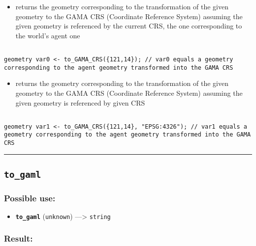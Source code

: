 \documentclass[]{book}
\providecommand{\tightlist}{%
  \setlength{\itemsep}{0pt}\setlength{\parskip}{0pt}}
\theoremstyle{definition}
\theoremstyle{definition}
\theoremstyle{definition}
\theoremstyle{remark}
\begin{document}
\begin{itemize}
\tightlist
\item
  returns the geometry corresponding to the transformation of the given
  geometry to the GAMA CRS (Coordinate Reference System) assuming the
  given geometry is referenced by the current CRS, the one corresponding
  to the world's agent one
\end{itemize}

\begin{verbatim}
 
geometry var0 <- to_GAMA_CRS({121,14}); // var0 equals a geometry corresponding to the agent geometry transformed into the GAMA CRS
\end{verbatim}

\begin{itemize}
\tightlist
\item
  returns the geometry corresponding to the transformation of the given
  geometry to the GAMA CRS (Coordinate Reference System) assuming the
  given geometry is referenced by given CRS
\end{itemize}

\begin{verbatim}
 
geometry var1 <- to_GAMA_CRS({121,14}, "EPSG:4326"); // var1 equals a geometry corresponding to the agent geometry transformed into the GAMA CRS
\end{verbatim}

\begin{center}\rule{0.5\linewidth}{\linethickness}\end{center}

\subsection{\texorpdfstring{\texttt{to\_gaml}}{to\_gaml}}\label{to_gaml}

\subsubsection{Possible use:}\label{possible-use-521}

\begin{itemize}
\tightlist
\item
  \textbf{\texttt{to\_gaml}} (\texttt{unknown}) ---\textgreater{}
  \texttt{string}
\end{itemize}

\subsubsection{Result:}\label{result-503}
\end{document}
